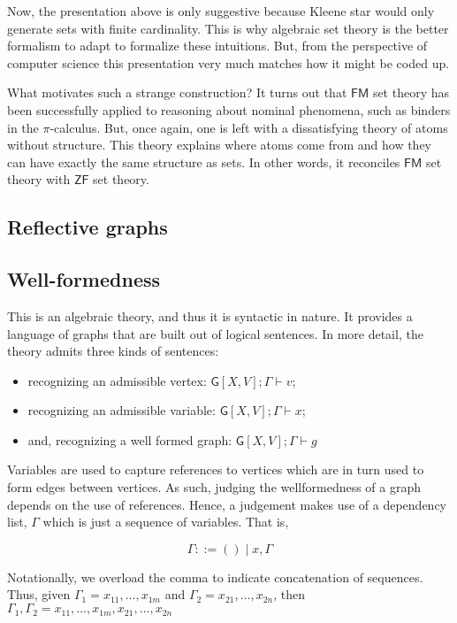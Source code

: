 Now, the presentation above is only suggestive because Kleene star
\cite{enwiki:1165979969} would only generate sets with finite
cardinality. This is why algebraic set theory is the better formalism
to adapt to formalize these intuitions. But, from the perspective of
computer science this presentation very much matches how it might be
coded up.

What motivates such a strange construction? It turns out that
$\mathsf{FM}$ set theory has been successfully applied to reasoning
about nominal phenomena, such as binders in the $\pi$-calculus. But,
once again, one is left with a dissatisfying theory of atoms without
structure. This theory explains where atoms come from and how they can
have exactly the same structure as sets. In other words, it reconciles
$\mathsf{FM}$ set theory with $\mathsf{ZF}$ set theory.

\subsection{Reflective graphs}

\subsection{Well-formedness}

This is an algebraic theory, and thus it is syntactic in nature. It
provides a language of graphs that are built out of logical sentences.
In more detail, the theory admits three kinds of sentences:

\begin{itemize}
\item
  recognizing an admissible vertex:
  \(\mathsf{G}[X,V]; \Gamma \vdash v\);
\item
  recognizing an admissible variable:
  \(\mathsf{G}[X,V]; \Gamma \vdash x\);
\item
  and, recognizing a well formed graph:
  \(\mathsf{G}[X,V]; \Gamma \vdash g\)
\end{itemize}

Variables are used to capture references to vertices which are in turn
used to form edges between vertices. As such, judging the wellformedness
of a graph depends on the use of references. Hence, a judgement makes
use of a dependency list, \(\Gamma\) which is just a sequence of
variables. That is,

\[\Gamma ::= () \;|\; x, \Gamma\]

Notationally, we overload the comma to indicate concatenation of
sequences. Thus, given \(\Gamma_1 = x_{11},\ldots,x_{1m}\) and
\(\Gamma_2 = x_{21},\ldots,x_{2n}\), then
\(\Gamma_1,\Gamma_2 = x_{11},\ldots,x_{1m},x_{21},\ldots,x_{2n}\)

